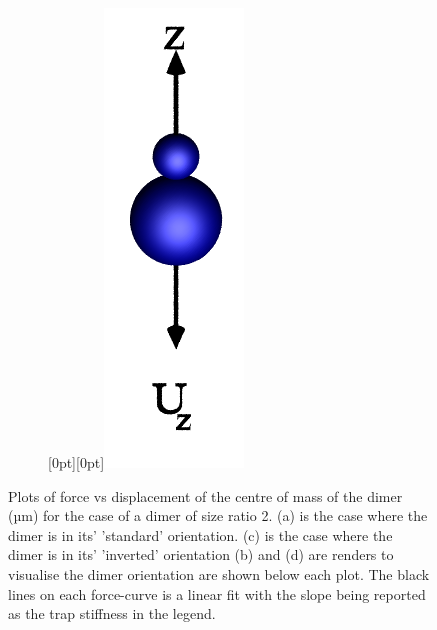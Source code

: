 \begin{figure}[h!]
\begin{subfigure}{.75\linewidth}
		\caption{}
		\label{lam=2_inverted}
	\end{subfigure}\hfill %
	\begin{subfigure}{.25\linewidth}
		\centering
		\raisebox{30pt}[0pt][0pt]{\makebox{}\includegraphics[width=0.3\linewidth, keepaspectratio]{theta=180.png}}
		\caption{}
		\label{small_over_large}
	\end{subfigure}
	\caption{Plots of force vs displacement of the centre of mass of 
		the dimer (µm) for the case of a dimer of size ratio 2. (a) is 
		the case where the dimer is in its' 'standard' orientation. 
		(c) is the case where the dimer is in its' 'inverted' orientation 
		(b) and (d) are renders to visualise the dimer orientation are shown 
		below each plot. The black lines on each force-curve is a linear 
		fit with the slope being reported as the trap stiffness in the legend.}
		\label{fig:paradigmatic}
\end{figure}

